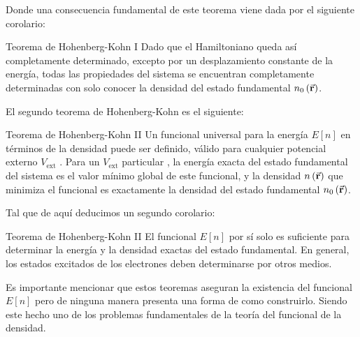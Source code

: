   Donde una consecuencia fundamental de este teorema viene dada por el siguiente corolario:

  \begin{mycoro}{Teorema de Hohenberg-Kohn I}{}
    Dado que el Hamiltoniano queda así completamente determinado, excepto por un desplazamiento constante de la energía, todas las propiedades del sistema se encuentran completamente determinadas con solo conocer la densidad del estado fundamental $n_0 \left( \va{r} \right)$.
\end{mycoro}

El segundo teorema de Hohenberg-Kohn es el siguiente:


\begin{mytheo}{Teorema de Hohenberg-Kohn II}{}
    Un funcional universal para la energía $E \left[ n \right]$ en términos de la densidad puede ser definido, válido para cualquier potencial externo $V_{\text{ext}}$ . Para un  $V_{\text{ext}}$ particular , la energía exacta del estado fundamental del sistema es el valor mínimo global de este funcional, y la densidad $n \left( \va{r} \right)$ que minimiza el funcional es exactamente la densidad del estado fundamental $n_0 \left( \va{r} \right)$.
\end{mytheo}

Tal que de aquí deducimos un segundo corolario:

\begin{mycoro}{Teorema de Hohenberg-Kohn II}{}
    El funcional $E \left[ n \right]$ por sí solo es suficiente para determinar la energía y la densidad exactas del estado fundamental. En general, los estados excitados de los electrones deben determinarse por otros medios.
\end{mycoro}

Es importante mencionar que estos teoremas aseguran la existencia del funcional $E \left[ n \right]$ pero de ninguna manera presenta una forma de como construirlo. Siendo este hecho uno de los problemas fundamentales de la teoría del funcional de la densidad.